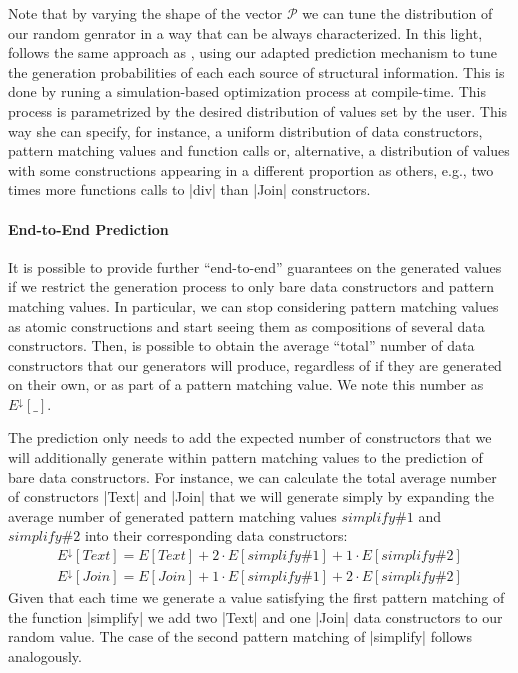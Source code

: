 Note that by varying the shape of the vector $\mathcal{P}$ we can tune the
distribution of our random genrator in a way that can be always characterized.
%
In this light, \dragenp follows the same approach as \dragen, using our adapted
prediction mechanism to tune the generation probabilities of each each source of
structural information.
%
This is done by runing a simulation-based optimization process at compile-time.
%
This process is parametrized by the desired distribution of values set by the
user.
%
This way she can specify, for instance, a uniform distribution of data
constructors, pattern matching values and function calls or, alternative, a
distribution of values with some constructions appearing in a different
proportion as others, e.g., two times more functions calls to |div| than |Join|
constructors.


\paragraph{End-to-End Prediction}
%

It is possible to provide further ``end-to-end'' guarantees on the generated
values if we restrict the generation process to only bare data constructors and
pattern matching values.
%
In particular, we can stop considering pattern matching values as atomic
constructions and start seeing them as compositions of several data
constructors.
%
Then, is possible to obtain the average ``total'' number of data constructors
that our generators will produce, regardless of if they are generated on their
own, or as part of a pattern matching value.
%
We note this number as $E^\downarrow\![\_]$.


The prediction only needs to add the expected number of constructors that we
will additionally generate within pattern matching values to the prediction of
bare data constructors.
%
For instance, we can calculate the total average number of constructors |Text|
and |Join| that we will generate simply by expanding the average number of
generated pattern matching values $simplify\#1$ and $simplify\#2$ into their
corresponding data constructors:
%
{\small
  \begin{align*}
    E^\downarrow\!\!\left[ Text \right]
    = E\left[ Text \right]
    + 2\! \cdot\!\! E\!\left[ simplify\#1 \right]
    + 1\!\! \cdot\!\! E\!\left[ simplify\#2 \right] \\
    E^\downarrow\!\!\left[ Join \right]
    = E\left[ Join \right]
    + 1\!\! \cdot\!\! E\!\left[ simplify\#1 \right]
    + 2\! \cdot\!\! E\!\left[ simplify\#2 \right]
  \end{align*}
}
%
Given that each time we generate a value satisfying the first pattern matching
of the function |simplify| we add two |Text| and one |Join| data constructors to
our random value.
%
The case of the second pattern matching of |simplify| follows analogously.


